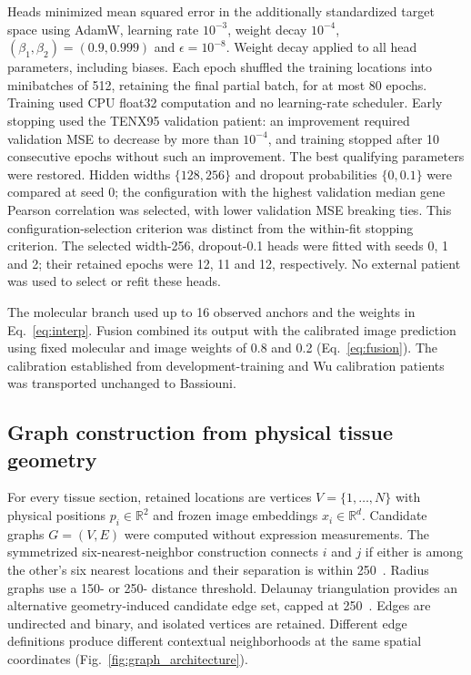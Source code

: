Heads minimized mean squared error in the additionally standardized target space using AdamW, learning rate $10^{-3}$, weight decay $10^{-4}$, $(\beta_1,\beta_2)=(0.9,0.999)$ and $\epsilon=10^{-8}$. Weight decay applied to all head parameters, including biases. Each epoch shuffled the training locations into minibatches of 512, retaining the final partial batch, for at most 80 epochs. Training used CPU float32 computation and no learning-rate scheduler. Early stopping used the TENX95 validation patient: an improvement required validation MSE to decrease by more than $10^{-4}$, and training stopped after 10 consecutive epochs without such an improvement. The best qualifying parameters were restored. Hidden widths $\{128,256\}$ and dropout probabilities $\{0,0.1\}$ were compared at seed 0; the configuration with the highest validation median gene Pearson correlation was selected, with lower validation MSE breaking ties. This configuration-selection criterion was distinct from the within-fit stopping criterion. The selected width-256, dropout-0.1 heads were fitted with seeds 0, 1 and 2; their retained epochs were 12, 11 and 12, respectively. No external patient was used to select or refit these heads.

The molecular branch used up to 16 observed anchors and the weights in Eq.~\ref{eq:interp}. Fusion combined its output with the calibrated image prediction using fixed molecular and image weights of 0.8 and 0.2 (Eq.~\ref{eq:fusion}). The calibration established from development-training and Wu calibration patients was transported unchanged to Bassiouni.

\subsection{Graph construction from physical tissue geometry}
For every tissue section, retained locations are vertices $V=\{1,\ldots,N\}$ with physical positions $p_i\in\mathbb{R}^2$ and frozen image embeddings $x_i\in\mathbb{R}^{d}$. Candidate graphs $G=(V,E)$ were computed without expression measurements. The symmetrized six-nearest-neighbor construction connects $i$ and $j$ if either is among the other's six nearest locations and their separation is within 250~\um{}. Radius graphs use a 150- or 250-\um{} distance threshold. Delaunay triangulation provides an alternative geometry-induced candidate edge set, capped at 250~\um{}. Edges are undirected and binary, and isolated vertices are retained. Different edge definitions produce different contextual neighborhoods at the same spatial coordinates (Fig.~\ref{fig:graph_architecture}).

